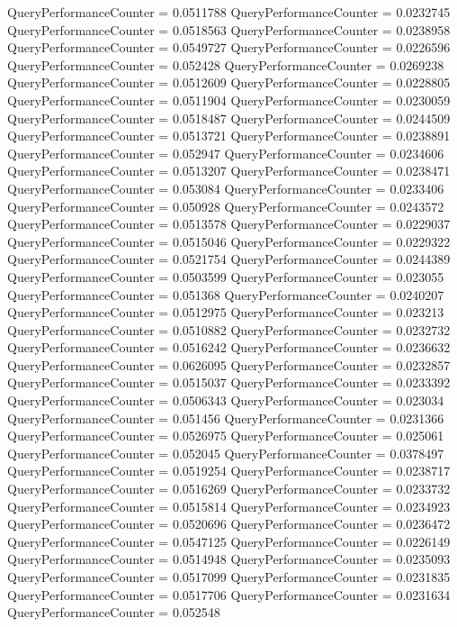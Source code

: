 \documentclass[9pt]{article}
\theoremstyle{plain}
\theoremstyle{definition}
\theoremstyle{remark}
\numberwithin{equation}{section}
\begin{document}
QueryPerformanceCounter  =  0.0511788
QueryPerformanceCounter  =  0.0232745
QueryPerformanceCounter  =  0.0518563
QueryPerformanceCounter  =  0.0238958
QueryPerformanceCounter  =  0.0549727
QueryPerformanceCounter  =  0.0226596
QueryPerformanceCounter  =  0.052428
QueryPerformanceCounter  =  0.0269238
QueryPerformanceCounter  =  0.0512609
QueryPerformanceCounter  =  0.0228805
QueryPerformanceCounter  =  0.0511904
QueryPerformanceCounter  =  0.0230059
QueryPerformanceCounter  =  0.0518487
QueryPerformanceCounter  =  0.0244509
QueryPerformanceCounter  =  0.0513721
QueryPerformanceCounter  =  0.0238891
QueryPerformanceCounter  =  0.052947
QueryPerformanceCounter  =  0.0234606
QueryPerformanceCounter  =  0.0513207
QueryPerformanceCounter  =  0.0238471
QueryPerformanceCounter  =  0.053084
QueryPerformanceCounter  =  0.0233406
QueryPerformanceCounter  =  0.050928
QueryPerformanceCounter  =  0.0243572
QueryPerformanceCounter  =  0.0513578
QueryPerformanceCounter  =  0.0229037
QueryPerformanceCounter  =  0.0515046
QueryPerformanceCounter  =  0.0229322
QueryPerformanceCounter  =  0.0521754
QueryPerformanceCounter  =  0.0244389
QueryPerformanceCounter  =  0.0503599
QueryPerformanceCounter  =  0.023055
QueryPerformanceCounter  =  0.051368
QueryPerformanceCounter  =  0.0240207
QueryPerformanceCounter  =  0.0512975
QueryPerformanceCounter  =  0.023213
QueryPerformanceCounter  =  0.0510882
QueryPerformanceCounter  =  0.0232732
QueryPerformanceCounter  =  0.0516242
QueryPerformanceCounter  =  0.0236632
QueryPerformanceCounter  =  0.0626095
QueryPerformanceCounter  =  0.0232857
QueryPerformanceCounter  =  0.0515037
QueryPerformanceCounter  =  0.0233392
QueryPerformanceCounter  =  0.0506343
QueryPerformanceCounter  =  0.023034
QueryPerformanceCounter  =  0.051456
QueryPerformanceCounter  =  0.0231366
QueryPerformanceCounter  =  0.0526975
QueryPerformanceCounter  =  0.025061
QueryPerformanceCounter  =  0.052045
QueryPerformanceCounter  =  0.0378497
QueryPerformanceCounter  =  0.0519254
QueryPerformanceCounter  =  0.0238717
QueryPerformanceCounter  =  0.0516269
QueryPerformanceCounter  =  0.0233732
QueryPerformanceCounter  =  0.0515814
QueryPerformanceCounter  =  0.0234923
QueryPerformanceCounter  =  0.0520696
QueryPerformanceCounter  =  0.0236472
QueryPerformanceCounter  =  0.0547125
QueryPerformanceCounter  =  0.0226149
QueryPerformanceCounter  =  0.0514948
QueryPerformanceCounter  =  0.0235093
QueryPerformanceCounter  =  0.0517099
QueryPerformanceCounter  =  0.0231835
QueryPerformanceCounter  =  0.0517706
QueryPerformanceCounter  =  0.0231634
QueryPerformanceCounter  =  0.052548
\end{document}
